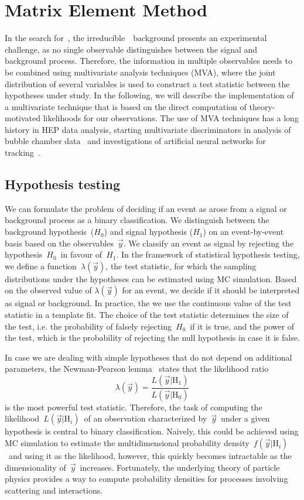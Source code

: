 \section{Matrix Element Method}
\label{sec:mem}
In the search for~\ttHbb, the irreducible~\ttbb~background presents an experimental challenge, as no single observable distinguishes between the signal and background process. Therefore, the information in multiple observables needs to be combined using multivariate analysis techniques (MVA), where the joint distribution of several variables is used to construct a test statistic between the hypotheses under study. In the following, we will describe the implementation of a multivariate technique that is based on the direct computation of theory-motivated likelihoods for our observations. The use of MVA techniques has a long history in HEP data analysis, starting multivariate discriminators in analysis of bubble chamber data~\cite{VanDoninck:1984wd} and investigations of artificial neural networks for tracking~\cite{Denby:1987rk}.

\subsection{Hypothesis testing}
\label{sec:test_statistic}
We can formulate the problem of deciding if an event as arose from a signal or background process as a binary classification. We distinguish between the background hypothesis~($H_0$) and signal hypothesis ($H_1$) on an event-by-event basis based on the observables~$\vec{y}$. We classify an event as signal by rejecting the hypothesis~$H_0$~in favour of~$H_1$. In the framework of statistical hypothesis testing, we define a function~$\lambda(\vec{y})$, the test statistic, for which the sampling distributions under the hypotheses can be estimated using MC simulation. Based on the observed value of $\lambda(\vec{y})$ for an event, we decide if it should be interpreted as signal or background. In practice, the we use the continuous value of the test statistic in a template fit. The choice of the test statistic determines the size of the test, i.e. the probability of falsely rejecting~$H_0$~if it is true, and the power of the test, which is the probability of rejecting the null hypothesis in case it is false.

In case we are dealing with simple hypotheses that do not depend on additional parameters, the Newman-Pearson lemma~\cite{neyman1992problem} states that the likelihood ratio
\begin{equation}
\lambda(\vec{y}) = \frac{L(\vec{y}|\mathrm{H}_1)}{L(\vec{y}|\mathrm{H}_0)}
\end{equation}
is the most powerful test statistic. Therefore, the task of computing the likelihood~$L(\vec{y}|\mathrm{H}_i)$~of an observation characterized by~$\vec{y}$~under a given hypothesis is central to binary classification. Naively, this could be achieved using MC simulation to estimate the multidimensional probability density~$f(\vec{y}|\mathrm{H}_i)$~and using it as the likelihood, however, this quickly becomes intractable as the dimensionality of~$\vec{y}$~increases. Fortunately, the underlying theory of particle physics provides a way to compute probability densities for processes involving scattering and interactions.

